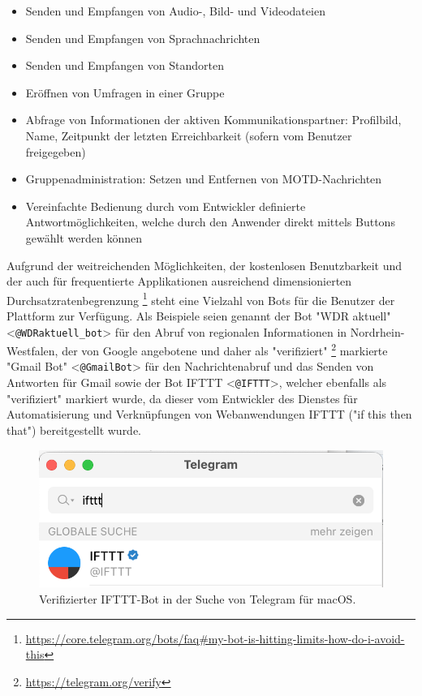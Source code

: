 \begin{itemize}
\item Senden und Empfangen von Audio-, Bild- und Videodateien
\item Senden und Empfangen von Sprachnachrichten
\item Senden und Empfangen von Standorten
\item Eröffnen von Umfragen in einer Gruppe
\item Abfrage von Informationen der aktiven Kommunikationspartner: Profilbild, Name, Zeitpunkt der letzten Erreichbarkeit (sofern vom Benutzer freigegeben)
\item Gruppenadministration: Setzen und Entfernen von MOTD-Nachrichten
\item Vereinfachte Bedienung durch vom Entwickler definierte Antwortmöglichkeiten, welche durch den Anwender direkt mittels Buttons gewählt werden können
\end{itemize}

Aufgrund der weitreichenden Möglichkeiten, der kostenlosen Benutzbarkeit und der auch für frequentierte Applikationen ausreichend dimensionierten Durchsatzratenbegrenzung \footnote{\url{https://core.telegram.org/bots/faq\#my-bot-is-hitting-limits-how-do-i-avoid-this}} steht eine Vielzahl von Bots für die Benutzer der Plattform zur Verfügung. Als Beispiele seien genannt der Bot "WDR aktuell" <\lstinline{@WDRaktuell_bot}> für den Abruf von regionalen Informationen in Nordrhein-Westfalen, der von Google angebotene und daher als "verifiziert" \footnote{\url{https://telegram.org/verify}} markierte "Gmail Bot" <\lstinline{@GmailBot}> für den Nachrichtenabruf und das Senden von Antworten für Gmail sowie der Bot IFTTT <\lstinline{@IFTTT}>, welcher ebenfalls als "verifiziert" markiert wurde, da dieser vom Entwickler des Dienstes für Automatisierung und Verknüpfungen von Webanwendungen IFTTT ("if this then that") bereitgestellt wurde.


\begin{figure}[h!]
\centering
\includegraphics[scale=0.5]{verified_ifttt_bot}
\caption{Verifizierter IFTTT-Bot in der Suche von Telegram für macOS.}
\end{figure}

